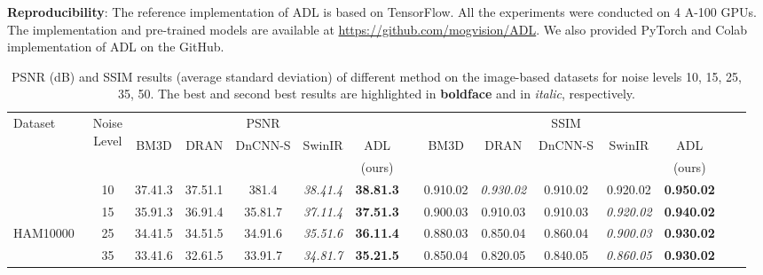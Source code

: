 \documentclass[journal,twoside,web]{ieeecolor}
\begin{document}
\textbf{Reproducibility}: The reference implementation of ADL is based on TensorFlow. All the experiments were conducted on 4 A-100 GPUs. 
The implementation and pre-trained models are available at \url{https://github.com/mogvision/ADL}. We also provided PyTorch and Colab implementation of ADL on the GitHub.
\renewcommand{\tabcolsep}{2.5pt}
\begin{table*}
\caption{PSNR (dB) and SSIM results (average  standard deviation) of different method on the image-based datasets for noise levels 10, 15, 25, 35, 50. The best and second best results are highlighted in \textbf{boldface} and in \textit{italic}, respectively.} 
    \label{table:psnr}
\centering 
\begin{tabular}{lcccccccccccccc} \toprule
    \multirow{3}{*}{
    \parbox[c]{.05\linewidth}{\centering Dataset}}&
    \multirow{3}{*}{
    \parbox[c]{.05\linewidth}{\centering Noise\\Level}}
    &&& \multicolumn{1}{c}{PSNR	} &&
    &&&&\multicolumn{1}{c}{SSIM	} \\ 
    \cmidrule{3-7} \cmidrule{9-13}
 && \multicolumn{1}{c}{BM3D} & \multicolumn{1}{c}{DRAN} & \multicolumn{1}{c}{DnCNN-S} & \multicolumn{1}{c}{SwinIR} & \multicolumn{1}{c}{ADL} & & \multicolumn{1}{c}{BM3D} & \multicolumn{1}{c}{DRAN} & \multicolumn{1}{c}{DnCNN-S} & \multicolumn{1}{c}{SwinIR} & \multicolumn{1}{c}{ADL}\\
  && \multicolumn{1}{c}{\cite{makinen2020collaborative}} & \multicolumn{1}{c}{\cite{sharif2020learning}} & \multicolumn{1}{c}{\cite{zhang2017beyond}} & \multicolumn{1}{c}{\cite{liang2021swinir}} & \multicolumn{1}{c}{(ours)} & & \multicolumn{1}{c}{\cite{makinen2020collaborative}} & \multicolumn{1}{c}{\cite{sharif2020learning}} & \multicolumn{1}{c}{\cite{zhang2017beyond}} & \multicolumn{1}{c}{\cite{liang2021swinir}} & \multicolumn{1}{c}{(ours)}\\
\toprule
& 10 & 37.41.3 & 37.51.1 & 381.4 & \textit{38.41.4} & \textbf{38.81.3}&& 0.910.02 & \textit{0.930.02} & 0.910.02 & 0.920.02 & \textbf{0.950.02}\\
& 15 & 35.91.3 & 36.91.4 & 35.81.7 & \textit{37.11.4} & \textbf{37.51.3} && 0.900.03 & 0.910.03 & 0.910.03 & \textit{0.920.02} & \textbf{0.940.02}\\
\verb//HAM10000~\cite{DBW86T_2018}& 25 & 34.41.5 & 34.51.5 & 34.91.6 & \textit{35.51.6} & \textbf{36.11.4}
&& 0.880.03 & 0.850.04 & 0.860.04 & \textit{0.900.03} & \textbf{0.930.02}\\
& 35 & 33.41.6 & 32.61.5 & 33.91.7 & \textit{34.81.7} & \textbf{35.21.5} && 0.850.04 & 0.820.05 & 0.840.05 & \textit{0.860.05} & \textbf{0.930.02}\\

\end{tabular}
\end{table*}
\end{document}
